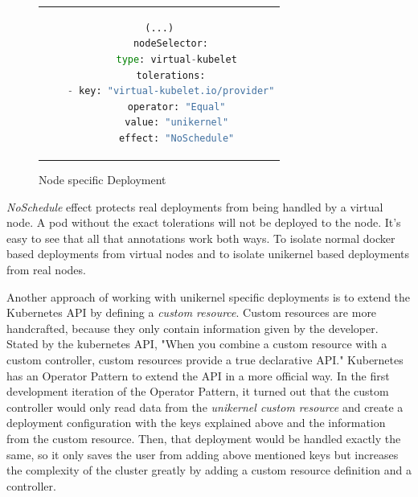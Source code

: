 \begin{figure}[htpb]
  \centering
  \begin{tabular}{c}
  \begin{lstlisting}[language=python]
    (...)
    nodeSelector:
      type: virtual-kubelet
    tolerations:
    - key: "virtual-kubelet.io/provider"
      operator: "Equal"
      value: "unikernel"
      effect: "NoSchedule"
\end{lstlisting}
\end{tabular}
\caption{Node specific Deployment}\label{fig:deployment}
\end{figure}
\textit{NoSchedule} effect protects real deployments from being handled by a virtual node. A pod without the exact tolerations will not be deployed to the node. It's easy to see that all that annotations work both ways. To isolate normal docker based deployments from virtual nodes and to isolate unikernel based deployments from real nodes.

Another approach of working with unikernel specific deployments is to extend the Kubernetes API by defining a \textit{custom resource}. Custom resources are more handcrafted, because they only contain information given by the developer. Stated by the kubernetes API, "When you combine a custom resource with a custom controller, custom resources provide a true declarative API." Kubernetes has an Operator Pattern to extend the API in a more official way. In the first development iteration of the Operator Pattern, it turned out that the custom controller would only read data from the \textit{unikernel custom resource} and create a deployment configuration with the keys explained above and the information from the custom resource. Then, that deployment would be handled exactly the same, so it only saves the user from adding above mentioned keys but increases the complexity of the cluster greatly by adding a custom resource definition and a controller.

